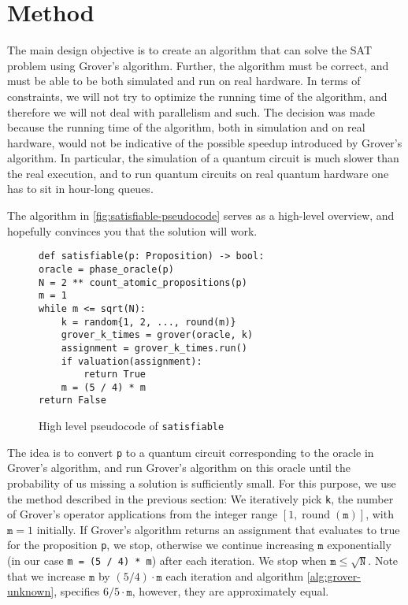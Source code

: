 \section{Method}\label{sec:method}

The main design objective is to create an algorithm that can solve the SAT problem using Grover's algorithm.
Further, the algorithm must be correct, and must be able to be both simulated and run on real hardware.
In terms of constraints, we will not try to optimize the running time of the algorithm, and therefore we will not deal with parallelism and such.
The decision was made because the running time of the algorithm, both in simulation and on real hardware, would not be indicative of the possible speedup introduced by Grover's algorithm.
In particular, the simulation of a quantum circuit is much slower than the real execution, and to run quantum circuits on real quantum hardware one has to sit in hour-long queues.

The algorithm in \autoref{fig:satisfiable-pseudocode} serves as a high-level overview, and hopefully convinces you that the solution will work.

\begin{figure}
\centering
\begin{verbatim}
def satisfiable(p: Proposition) -> bool:
oracle = phase_oracle(p)
N = 2 ** count_atomic_propositions(p)
m = 1
while m <= sqrt(N):
    k = random{1, 2, ..., round(m)}
    grover_k_times = grover(oracle, k)
    assignment = grover_k_times.run()
    if valuation(assignment):
        return True
    m = (5 / 4) * m
return False
\end{verbatim}
\caption{High level pseudocode of \texttt{satisfiable} }
\label{fig:satisfiable-pseudocode}
\end{figure}

The idea is to convert \texttt{p} to a quantum circuit corresponding to the oracle in Grover's algorithm, and run Grover's algorithm on this oracle until the probability of us missing a solution is sufficiently small.
For this purpose, we use the method described in the previous section:
We iteratively pick \texttt{k}, the number of Grover's operator applications from the integer range $[1, \operatorname{round}(\texttt{m})]$, with $\texttt{m} = 1$ initially.
If Grover's algorithm returns an assignment that evaluates to true for the proposition \texttt{p}, we stop, otherwise we continue increasing $\texttt{m}$ exponentially (in our case \texttt{m = (5 / 4) * m}) after each iteration.
We stop when $\texttt{m} \leq \sqrt{\texttt{N}}$.
Note that we increase $\texttt{m}$ by $(5 / 4) \cdot \texttt{m}$ each iteration and algorithm \ref{alg:grover-unknown}, specifies $6/5 \cdot \texttt{m}$, however, they are approximately equal.
